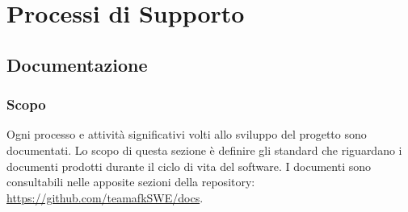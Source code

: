 \section{Processi di Supporto}
\subsection{Documentazione}
\subsubsection{Scopo}
Ogni processo e attività significativi volti allo sviluppo del progetto sono documentati. Lo scopo di questa sezione è definire gli standard che riguardano i documenti prodotti durante il ciclo di vita del software. I documenti sono consultabili nelle apposite sezioni della repository\glo: \\
\url{https://github.com/teamafkSWE/docs}. 		
